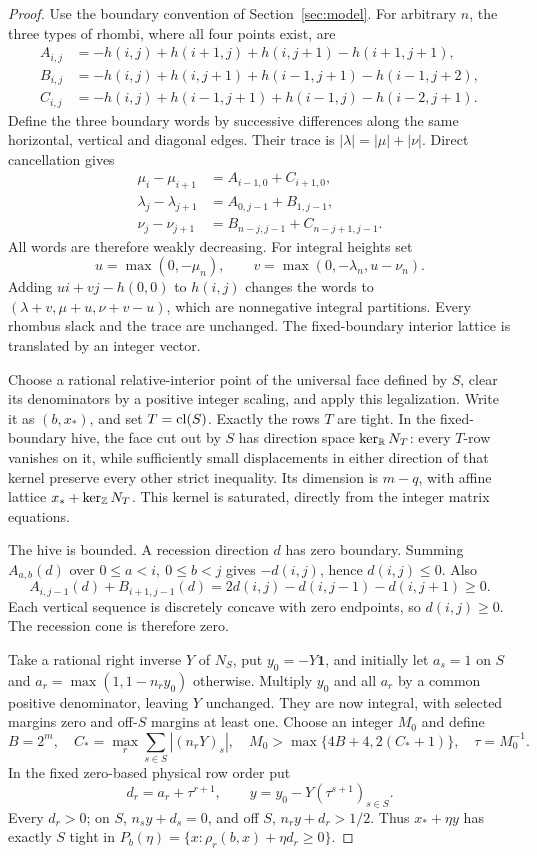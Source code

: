 \begin{proof}
Use the boundary convention of Section~\ref{sec:model}. For arbitrary \(n\),
the three types of rhombi, where all four points exist, are
\begin{align*}
A_{i,j}&=-h(i,j)+h(i+1,j)+h(i,j+1)-h(i+1,j+1),\\
B_{i,j}&=-h(i,j)+h(i,j+1)+h(i-1,j+1)-h(i-1,j+2),\\
C_{i,j}&=-h(i,j)+h(i-1,j+1)+h(i-1,j)-h(i-2,j+1).
\end{align*}
Define the three boundary words by successive differences along the same
horizontal, vertical and diagonal edges. Their trace is
\(|\lambda|=|\mu|+|\nu|\). Direct cancellation gives
\begin{align*}
\mu_i-\mu_{i+1}&=A_{i-1,0}+C_{i+1,0},\\
\lambda_j-\lambda_{j+1}&=A_{0,j-1}+B_{1,j-1},\\
\nu_j-\nu_{j+1}&=B_{n-j,j-1}+C_{n-j+1,j-1}.
\end{align*}
All words are therefore weakly decreasing. For integral heights set
\[
u=\max(0,-\mu_n),\qquad v=\max(0,-\lambda_n,u-\nu_n).
\]
Adding \(ui+vj-h(0,0)\) to \(h(i,j)\) changes the words to
\((\lambda+v,\mu+u,\nu+v-u)\), which are nonnegative integral partitions.
Every rhombus slack and the trace are unchanged. The fixed-boundary interior
lattice is translated by an integer vector.

Choose a rational relative-interior point of the universal face defined by
\(S\), clear its denominators by a positive integer scaling, and apply this
legalization. Write it as \((b,x_*)\), and set \(T=\operatorname{cl}(S)\).
Exactly the rows \(T\) are tight. In the fixed-boundary hive, the face cut
out by \(S\) has direction space \(\ker_{\mathbb R}N_T\): every \(T\)-row
vanishes on it, while sufficiently small displacements in either direction
of that kernel preserve every other strict inequality. Its dimension is
\(m-q\), with affine lattice \(x_*+\ker_{\mathbb Z}N_T\). This kernel is
saturated, directly from the integer matrix equations.

The hive is bounded. A recession direction \(d\) has zero boundary.
Summing \(A_{a,b}(d)\) over \(0\leq a<i,\ 0\leq b<j\) gives
\(-d(i,j)\), hence \(d(i,j)\leq0\). Also
\[
A_{i,j-1}(d)+B_{i+1,j-1}(d)
=2d(i,j)-d(i,j-1)-d(i,j+1)\geq0.
\]
Each vertical sequence is discretely concave with zero endpoints, so
\(d(i,j)\geq0\). The recession cone is therefore zero.

Take a rational right inverse \(Y\) of \(N_S\), put \(y_0=-Y\mathbf1\),
and initially let \(a_s=1\) on \(S\) and
\(a_r=\max(1,1-n_ry_0)\) otherwise. Multiply \(y_0\) and all \(a_r\)
by a common positive denominator, leaving \(Y\) unchanged. They are now
integral, with selected margins zero and off-\(S\) margins at least one.
Choose an integer \(M_0\) and define
\[
B=2^m,\quad C_* =\max_r\sum_{s\in S}|(n_rY)_s|,\quad
M_0>\max\{4B+4,2(C_*+1)\},\quad \tau=M_0^{-1}.
\]
In the fixed zero-based physical row order put
\[
d_r=a_r+\tau^{r+1},\qquad y=y_0-Y(\tau^{s+1})_{s\in S}.
\]
Every \(d_r>0\); on \(S\), \(n_sy+d_s=0\), and off \(S\),
\(n_ry+d_r>1/2\). Thus \(x_*+\eta y\) has exactly \(S\) tight in
\(P_b(\eta)=\{x:\rho_r(b,x)+\eta d_r\geq0\}\).


\end{proof}
